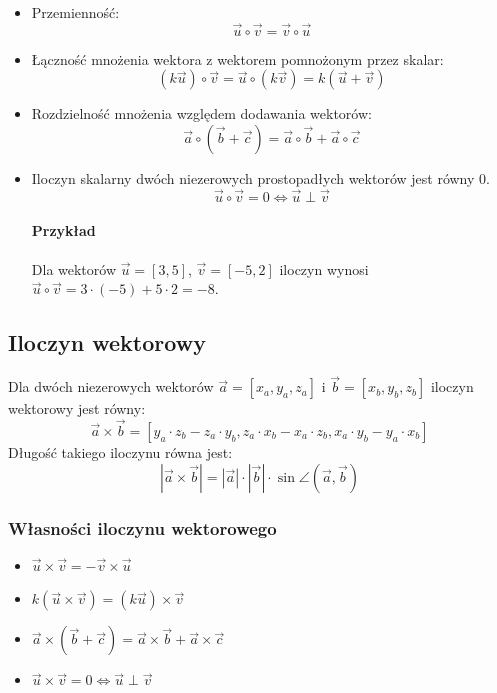 \documentclass [a4paper, 12pt, oneside]{article}
\newcommand{\vect}[1]{\overrightarrow{#1}}
\begin{document}
\begin{itemize}
    \item Przemienność:
    $$\vect u \circ \vect v = \vect v \circ \vect u$$
    \item Łączność mnożenia wektora z wektorem pomnożonym przez skalar:
    $$\left(k\vect u\right)\circ\vect v = \vect u \circ \left(k\vect v\right) = k\left(\vect u + \vect v\right)$$
    \item Rozdzielność mnożenia względem dodawania wektorów:
    \[
        \vect a \circ \left( \vect b + \vect c\right) = \vect a \circ \vect b + \vect a \circ \vect c
    \]
    \item Iloczyn skalarny dwóch niezerowych prostopadłych wektorów jest równy 0.
    \[
        \vect u \circ \vect v = 0 \Leftrightarrow \vect u \perp \vect v
    \]

\paragraph{Przykład} Dla wektorów $\vect u = [3,5]$, $\vect v = [-5,2]$ iloczyn wynosi $\vect u \circ \vect v = 3\cdot(-5) + 5\cdot 2 = -8$.
\end{itemize}

\subsection*{Iloczyn wektorowy}

Dla dwóch niezerowych wektorów $\vect a = [x_a, y_a, z_a]$ i $\vect b = [x_b, y_b, z_b]$ iloczyn wektorowy jest równy:
\[
    \vect a \times \vect b = [y_a\cdot z_b - z_a\cdot y_b, z_a\cdot x_b - x_a\cdot z_b, x_a\cdot y_b - y_a\cdot x_b]
\]
Długość takiego iloczynu równa jest:
\[
    \left| \vect a \times \vect b \right| = \left|\vect a\right| \cdot \left|\vect b\right| \cdot \sin\angle\left(\vect a, \vect b\right)
\]
\subsubsection*{Własności iloczynu wektorowego}
\begin{itemize}
    \item $\vect u \times \vect v = -\vect v \times \vect u$
    \item $k\left(\vect u \times \vect v\right) = \left(k\vect u\right) \times \vect v$
    \item $\vect a \times \left(\vect b +\vect c\right) = \vect a \times \vect b + \vect a \times \vect c$
    \item $\vect u \times \vect v = 0 \Leftrightarrow \vect u \perp \vect v$
\end{itemize}
\end{document}
